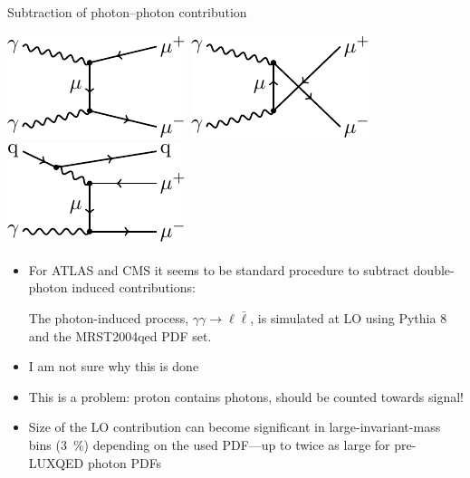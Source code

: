 \begin{frame}{Subtraction of photon--photon contribution}
\fontsize{9}{11}\selectfont
\begin{center}
\includegraphics[height=0.2\textheight]{ew_corrections/figures/fd02_born_photon_t_channel}
\includegraphics[height=0.2\textheight]{ew_corrections/figures/fd03_born_photon_u_channel}
\includegraphics[height=0.2\textheight]{ew_corrections/figures/fd06_photon_quark_real}
\end{center}
\vspace*{\fill}
\begin{itemize}
\item For ATLAS and CMS it seems to be standard procedure to subtract double-photon induced contributions:
\begin{displayquote}
The photon-induced process, $\gamma\gamma \to \ell \bar{\ell}$, is simulated at LO using Pythia 8 and the MRST2004qed PDF set.
\end{displayquote}
\item I am not sure why this is done
\item This is a problem: proton contains photons, should be counted towards signal!
\item Size of the LO contribution can become significant in large-invariant-mass bins (\SI{3}{\percent}) depending on the used PDF---up to twice as large for pre-LUXQED photon PDFs
\end{itemize}
\end{frame}

